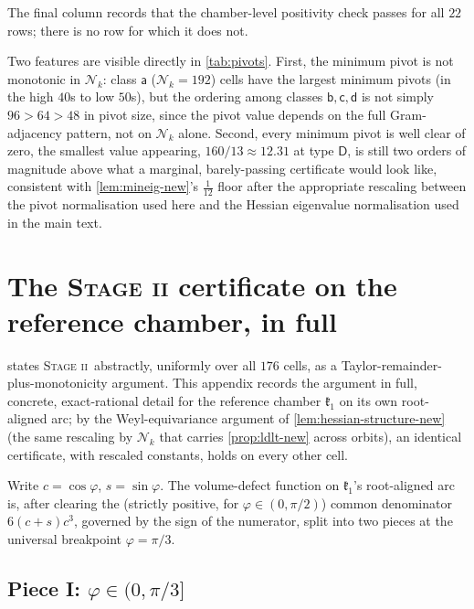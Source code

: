 \documentclass[11pt,reqno]{amsart}
\renewcommand{\_}{\origunderscore\allowbreak}
\numberwithin{equation}{section}
\theoremstyle{plain}
\theoremstyle{definition}
\theoremstyle{remark}
\newcommand{\Cell}[1]{\mathfrak{k}_{#1}}     %
\newcommand{\tilt}{\varphi}                  %
\newcommand{\norm}[1]{\mathcal{N}_{#1}}      %
\newcommand{\stagetwo}{\textnormal{\scshape Stage ii}}
\begin{document}
The final column records that the chamber-level positivity check
passes for all $22$ rows; there is no row for which it does not.

Two features are visible directly in \cref{tab:pivots}. First, the
minimum pivot is not monotonic in $\norm{k}$: class $\mathsf a$
($\norm{k}=192$) cells have the largest minimum pivots (in the high
$40$s to low $50$s), but the ordering among classes $\mathsf b,\mathsf
c,\mathsf d$ is not simply $96>64>48$ in pivot size, since the pivot
value depends on the full Gram-adjacency pattern, not on $\norm k$
alone. Second, every minimum pivot is well clear of zero, the
smallest value appearing, $160/13\approx12.31$ at type $\mathsf D$,
is still two orders of magnitude above what a marginal, barely-passing
certificate would look like, consistent with \cref{lem:mineig-new}'s
$\tfrac1{12}$ floor after the appropriate rescaling between the pivot
normalisation used here and the Hessian eigenvalue normalisation used
in the main text.
\section{The \texorpdfstring{\stagetwo}{Stage II} certificate on the reference chamber, in full}\label{app:stagetwo-data}

 states \stagetwo\ abstractly, uniformly over all
$176$ cells, as a Taylor-remainder-plus-monotonicity argument. This
appendix records the argument in full, concrete, exact-rational detail
for the reference chamber $\Cell1$ on its own root-aligned arc; by the
Weyl-equivariance argument of \cref{lem:hessian-structure-new} (the
same rescaling by $\norm{k}$ that carries \cref{prop:ldlt-new} across
orbits), an identical certificate, with rescaled constants, holds on
every other cell.

Write $c=\cos\tilt$, $s=\sin\tilt$. The volume-defect function on
$\Cell1$'s root-aligned arc is, after clearing the (strictly positive,
for $\tilt\in(0,\pi/2)$) common denominator $6(c+s)c^3$, governed by the
sign of the numerator, split into two pieces at the universal
breakpoint $\tilt=\pi/3$.

\subsection*{Piece I: \texorpdfstring{$\tilt\in(0,\pi/3]$}{theta in (0, pi/3]}}
\end{document}
